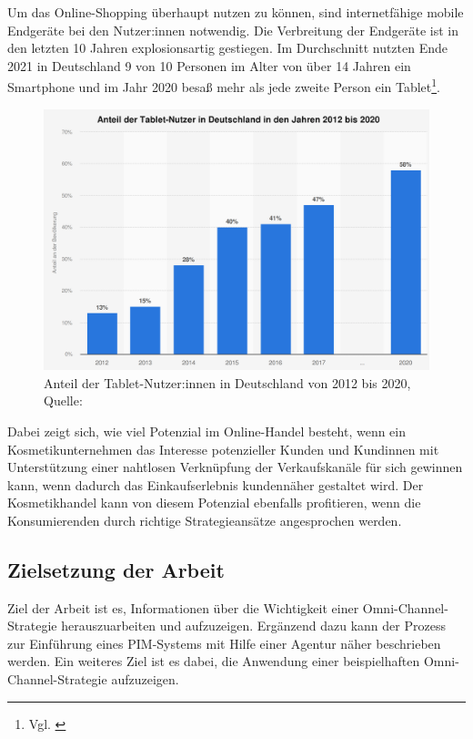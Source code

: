 Um das Online-Shopping überhaupt nutzen zu können, sind internetfähige mobile Endgeräte bei den Nutzer:innen notwendig. Die Verbreitung der Endgeräte ist in den letzten 10 Jahren explosionsartig gestiegen. Im Durchschnitt nutzten Ende 2021 in Deutschland 9 von 10 Personen im Alter von über 14 Jahren ein Smartphone und im Jahr 2020 besaß mehr als jede zweite Person ein Tablet\footnote{Vgl. \autocite [Online] {Touchpoints2022}}.
\begin{figure}[!ht]
    \centering
    \includegraphics[width=1\textwidth,angle=0]{src/abbildungen/tabletnutzer_2020.png}
    \caption[Quelle: Bitkom, 2020]{Anteil der Tablet-Nutzer:innen in Deutschland von 2012 bis 2020, Quelle: \autocite {Bitkom2021}}
   \label{fig: tablet_nutzer}
   \end{figure}

Dabei zeigt sich, wie viel Potenzial im Online-Handel besteht, wenn ein Kosmetikunternehmen das Interesse potenzieller Kunden und Kundinnen mit Unterstützung einer nahtlosen Verknüpfung der Verkaufskanäle für sich gewinnen kann, wenn dadurch das Einkaufserlebnis kundennäher gestaltet wird. Der Kosmetikhandel kann von diesem Potenzial ebenfalls  profitieren, wenn die Konsumierenden durch richtige Strategieansätze angesprochen werden.

\subsection{Zielsetzung der Arbeit}\label{zielsetzung}
Ziel der Arbeit ist es, Informationen über die Wichtigkeit einer Omni-Channel-Strategie herauszuarbeiten und aufzuzeigen. Ergänzend dazu kann der Prozess zur Einführung eines PIM-Systems mit Hilfe einer Agentur näher beschrieben werden. Ein weiteres Ziel ist es dabei, die Anwendung einer beispielhaften Omni-Channel-Strategie aufzuzeigen.

